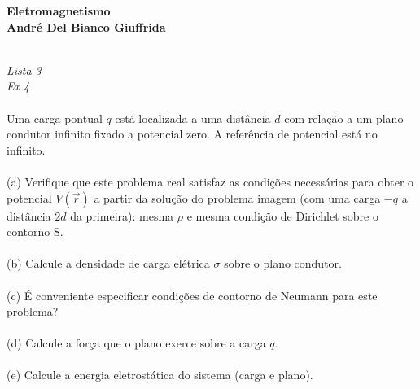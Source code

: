 \documentclass[a4paper,11pt]{exam}
\begin{document}
\begingroup 
	  \bf \Large Eletromagnetismo\\
	  \indent \normalsize André Del Bianco Giuffrida
	\endgroup
	\\ \quad
	\\
	\large{
	\emph{Lista 3 \\ Ex 4}
	\\
	\\
	\indent Uma carga pontual $q$ está localizada a uma distância $d$ com relação a um plano condutor infinito fixado a potencial zero. A referência de potencial está no infinito.
	\\
	\\
	\indent (a) Verifique que este problema real satisfaz as condições necessárias para obter o potencial $V(\vec{r})$ a partir da solução do problema imagem (com uma carga $-q$ a distância $2d$ da primeira): mesma $\rho$ e mesma condição de Dirichlet sobre o contorno S.
	\\
	\\
	\indent (b) Calcule a densidade de carga elétrica $\sigma$ sobre o plano condutor.
	\\
	\\
	\indent (c) É conveniente especificar condições de contorno de Neumann para este problema?
	\\
	\\
	\indent (d) Calcule a força que o plano exerce sobre a carga $q$.
	\\
	\\
	\indent (e) Calcule a energia eletrostática do sistema (carga e plano). 
	\\
	
	\normalsize
	\begin{center}
\end{center}}
\end{document}
